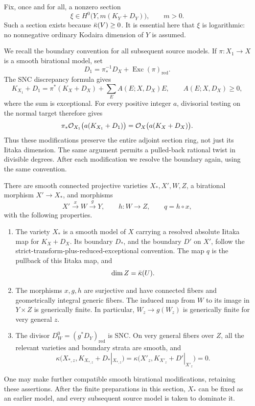 Fix, once and for all, a nonzero section
\begin{equation}\label{it:base-form}
 \xi\in H^0\bigl(Y,m(K_Y+D_Y)\bigr),\qquad m>0.
\end{equation}
Such a section exists because $\bar\kappa(V)\geq0$.  It is essential here that
$\xi$ is logarithmic: no nonnegative ordinary Kodaira dimension of $Y$ is
assumed.

We recall the boundary convention for all subsequent source models.
If $\pi:X_1\to X$ is a smooth birational model, set
\[
 D_1=\pi_*^{-1}D_X+\operatorname{Exc}(\pi)_{\mathrm{red}}.
\]
The SNC discrepancy formula gives
\begin{equation}\label{it:exceptional-sections}
 K_{X_1}+D_1
 =\pi^*(K_X+D_X)+\sum_E A(E;X,D_X)E,
 \qquad A(E;X,D_X)\geq0,
\end{equation}
where the sum is exceptional.  For every positive integer $a$, divisorial
testing on the normal target therefore gives
\[
 \pi_*\mathcal O_{X_1}\bigl(a(K_{X_1}+D_1)\bigr)
 =\mathcal O_X\bigl(a(K_X+D_X)\bigr).
\]
Thus these modifications preserve the entire adjoint section ring, not
just its Iitaka dimension.  The same argument permits a pulled-back
rational twist in divisible degrees.  After each modification we resolve
the boundary again, using the same convention.

\begin{proposition}\label{it:diagram}
There are smooth connected projective varieties $X_*,X',W,Z$, a birational
morphism $X'\to X_*$, and morphisms
\[
 X'\xrightarrow{x}W\xrightarrow{g}Y,
 \qquad h:W\to Z,\qquad q=h\circ x,
\]
with the following properties.
\begin{enumerate}[label=\textup{(\roman*)}]
 \item The variety $X_*$ is a smooth model of $X$ carrying a resolved
 absolute Iitaka map for $K_X+D_X$.  Its boundary $D_*$, and the boundary
 $D'$ on $X'$, follow the strict-transform-plus-reduced-exceptional
 convention.  The map $q$ is the pullback of this Iitaka map, and
 \begin{equation}\label{it:iitaka-dimension}
  \dim Z=\bar\kappa(U).
 \end{equation}
 \item The morphisms $x,g,h$ are surjective and have connected fibers and
 geometrically integral generic fibers.  The induced map from $W$ to
 its image in $Y\times Z$ is generically finite.  In particular,
 $W_z\to g(W_z)$ is generically finite for very general $z$.
 \item The divisor
 $D_W^0=(g^*D_Y)_{\mathrm{red}}$ is SNC.  On very general fibers over $Z$,
 all the relevant varieties and boundary strata are smooth, and
 \begin{equation}\label{it:absolute-fiber}
  \kappa\bigl(X_{*,z},K_{X_{*,z}}+D_*|_{X_{*,z}}\bigr)
  =\kappa\bigl(X'_z,K_{X'_z}+D'|_{X'_z}\bigr)=0.
 \end{equation}
\end{enumerate}
One may make further compatible smooth birational modifications, retaining
these assertions.  After the finite preparations in this section, $X_*$
can be fixed as an earlier model, and every subsequent source model is
taken to dominate it.
\end{proposition}

